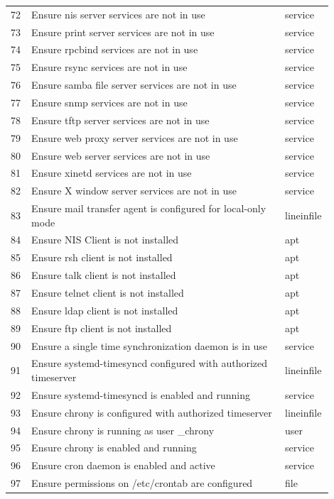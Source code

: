 \begin{longtable}{|p{0.05\linewidth}|p{0.75\linewidth}|p{0.1\linewidth}|}
72 & Ensure nis server services are not in use & service \\
73 & Ensure print server services are not in use & service \\
74 & Ensure rpcbind services are not in use & service \\
75 & Ensure rsync services are not in use & service \\
76 & Ensure samba file server services are not in use & service \\
77 & Ensure snmp services are not in use & service \\
78 & Ensure tftp server services are not in use & service \\
79 & Ensure web proxy server services are not in use & service \\
80 & Ensure web server services are not in use & service \\
81 & Ensure xinetd services are not in use & service \\
82 & Ensure X window server services are not in use & service \\
83 & Ensure mail transfer agent is configured for local-only mode & lineinfile \\
84 & Ensure NIS Client is not installed & apt \\
85 & Ensure rsh client is not installed & apt \\
86 & Ensure talk client is not installed & apt \\
87 & Ensure telnet client is not installed & apt \\
88 & Ensure ldap client is not installed & apt \\
89 & Ensure ftp client is not installed & apt \\
90 & Ensure a single time synchronization daemon is in use & service \\
91 & Ensure systemd-timesyncd configured with authorized timeserver & lineinfile \\
92 & Ensure systemd-timesyncd is enabled and running & service \\
93 & Ensure chrony is configured with authorized timeserver & lineinfile \\
94 & Ensure chrony is running as user \_chrony & user \\
95 & Ensure chrony is enabled and running & service \\
96 & Ensure cron daemon is enabled and active & service \\
97 & Ensure permissions on /etc/crontab are configured & file \\

\end{longtable}
